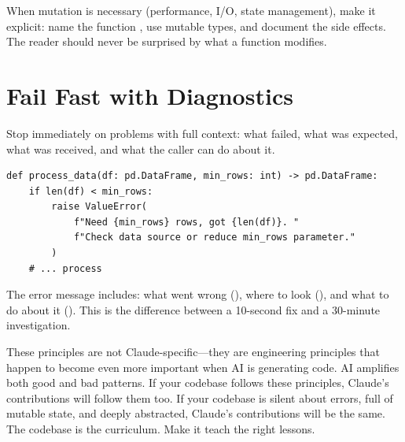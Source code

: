 When mutation is necessary (performance, I/O, state management),
make it explicit: name the function , use mutable types,
and document the side effects. The reader should never be surprised
by what a function modifies.

\section{Fail Fast with Diagnostics}

Stop immediately on problems with full context:
what failed, what was expected, what was received,
and what the caller can do about it.

\begin{verbatim}
def process_data(df: pd.DataFrame, min_rows: int) -> pd.DataFrame:
    if len(df) < min_rows:
        raise ValueError(
            f"Need {min_rows} rows, got {len(df)}. "
            f"Check data source or reduce min_rows parameter."
        )
    # ... process
\end{verbatim}


The error message includes: what went wrong (),
where to look (), and what to do about it
(). This is the difference between a
10-second fix and a 30-minute investigation.

\vspace{1\baselineskip}

\begin{keyinsight}
These principles are not Claude-specific---they are engineering principles
that happen to become even more important when AI is generating code.
AI amplifies both good and bad patterns. If your codebase follows
these principles, Claude's contributions will follow them too.
If your codebase is silent about errors, full of mutable state,
and deeply abstracted, Claude's contributions will be the same.
The codebase is the curriculum. Make it teach the right lessons.
\end{keyinsight}
